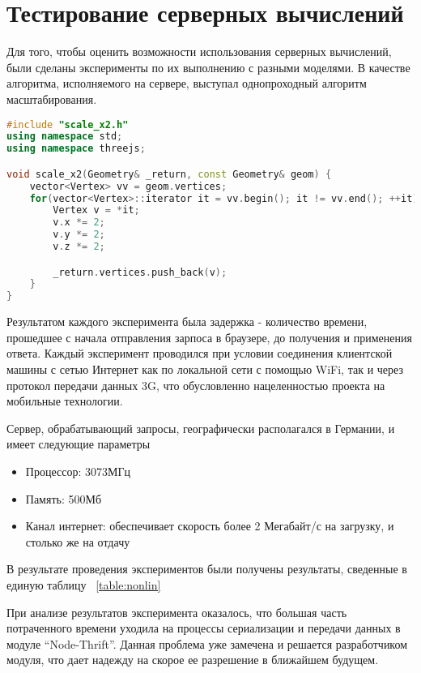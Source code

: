 \section{Тестирование серверных вычислений}

Для того, чтобы оценить возможности использования серверных вычислений, были
сделаны эксперименты по их выполнению с разными моделями. В качестве алгоритма,
исполняемого на сервере, выступал однопроходный алгоритм масштабирования.

\begin{lstlisting}[language=c++]
#include "scale_x2.h"
using namespace std;
using namespace threejs;

void scale_x2(Geometry& _return, const Geometry& geom) {
    vector<Vertex> vv = geom.vertices;
    for(vector<Vertex>::iterator it = vv.begin(); it != vv.end(); ++it) {
        Vertex v = *it;
        v.x *= 2;
        v.y *= 2;
        v.z *= 2;

        _return.vertices.push_back(v);
    }
}
\end{lstlisting}

Результатом каждого эксперимента была задержка - количество времени, прошедшее
с начала отправления зарпоса в браузере, до получения и применения ответа.
Каждый эксперимент проводился при условии соединения клиентской машины с сетью
Интернет как по локальной сети с помощью WiFi, так и через протокол передачи
данных 3G, что обусловленно нацеленностью проекта на мобильные технологии.

Сервер, обрабатывающий запросы, географически располагался в Германии, и имеет
следующие параметры
\begin{itemize}
    \item Процессор: 3073МГц
    \item Память: 500Мб
    \item Канал интернет: обеспечивает скорость более 2 Мегабайт/с на загрузку, и
    столько же на отдачу
\end{itemize}

В результате проведения экспериментов были получены результаты,
сведенные в единую таблицу ~\ref{table:nonlin}

\begin{table}[ht]
\begin{center}
\end{center}
\caption{Задержка серверных вычислений}
\label{table:nonlin}
\end{table}

При анализе результатов эксперимента оказалось, что большая часть потраченного
времени уходила на процессы сериализации и передачи данных в модуле
``Node-Thrift''. Данная проблема уже замечена и решается разработчиком модуля,
что дает надежду на скорое ее разрешение в ближайшем будущем.

